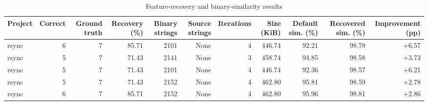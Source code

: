 \begin{table}[htbp]
\centering
\caption{Feature-recovery and binary-similarity results}
\label{tab:feature-recovery-results}
\small
\begin{tabular}{lrrrrrrrrrr}
\toprule
Project & Correct & Ground truth & Recovery (\%) & Binary strings & Source strings & Iterations & Size (KiB) & Default sim. (\%) & Recovered sim. (\%) & Improvement (pp) \\
\midrule
rsync & 6 & 7 & 85.71 & 2101 & None & 4 & 446.74 & 92.21 & 98.78 & +6.57 \\
rsync & 5 & 7 & 71.43 & 2141 & None & 3 & 458.74 & 94.85 & 98.58 & +3.73 \\
rsync & 5 & 7 & 71.43 & 2101 & None & 4 & 446.74 & 92.36 & 98.57 & +6.21 \\
rsync & 5 & 7 & 71.43 & 2152 & None & 4 & 462.80 & 95.81 & 98.59 & +2.78 \\
rsync & 6 & 7 & 85.71 & 2152 & None & 4 & 462.80 & 95.96 & 98.81 & +2.86 \\
\bottomrule
\end{tabular}
\end{table}
